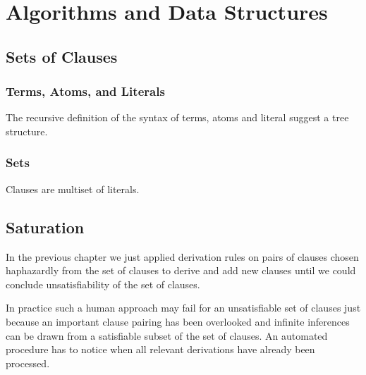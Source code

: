 
\chapter{Algorithms and Data Structures}

\section{Sets of Clauses}

\subsection{Terms, Atoms, and Literals}

The recursive definition of the syntax of terms, atoms and literal suggest a tree structure.



\subsection{Sets}

Clauses are multiset of literals.


\section{Saturation}

In the previous chapter we just applied derivation rules
on pairs of clauses chosen haphazardly from the set of clauses
to derive and add new clauses
until we could conclude unsatisfiability of the set of clauses.

In practice such a human approach may fail for an unsatisfiable set of clauses
just because an important clause pairing has been overlooked
and infinite inferences can be drawn from a satisfiable subset of the set of clauses.
An automated procedure has to notice when all relevant derivations
have already been processed.

